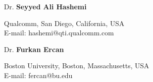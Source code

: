 \documentclass[10pt]{article}
\newenvironment{innerlist}[1][\enskip$\circ$]%
{\begin{compactitem}[#1]}{\end{compactitem}}
\begin{document}
	\halfblankline
	Dr. \textbf{Seyyed Ali Hashemi}
	\begin{innerlist}
		\item[] 
		Qualcomm, San Diego, California, USA\\
		{E-mail: hashemi@qti.qualcomm.com}
	\end{innerlist}	

	\halfblankline
	Dr. \textbf{Furkan Ercan}
	\begin{innerlist}
		\item[] 
		Boston University, Boston, Massachusetts, USA\\
		{E-mail: fercan@bu.edu}
	\end{innerlist}	
\end{document}
